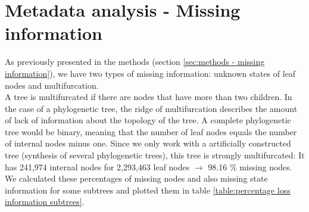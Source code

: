   \section{Metadata analysis - Missing information} \label{sec:results - missing information}
    As previously presented in the methods (section \ref{sec:methods - missing information}), we have 
      two types of missing information: unknown states of leaf nodes and multifurcation. \\

    A tree is multifurcated if there are nodes that have more than two children. In the case of a 
      phylogenetic tree, the ridge of multifurcation describes the amount of lack of information about 
      the topology of the tree. A complete phylogenetic tree would be binary, meaning that the number 
      of leaf nodes equals the number of internal nodes minus one. Since we only work with a 
      artificially constructed tree (synthesis of several phylogenetic trees), this tree is strongly 
      multifurcated: It has 241,974 internal nodes for 2,293,463 leaf nodes $\rightarrow$ 98.16 \% 
      missing nodes. \\
    We calculated these percentages of missing nodes and also missing state information for some 
      subtrees and plotted them in table \ref{table:percentage loss information subtrees}. \\
